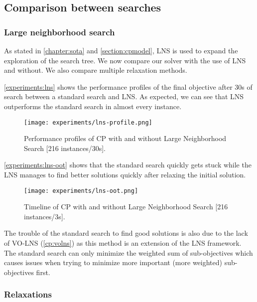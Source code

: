 \documentclass[../../thesis.tex]{subfiles}
\begin{document}
\FloatBarrier

\subsection{Comparison between searches}

\subsubsection{Large neighborhood search}


As stated in \autoref{chapter:sota} and \autoref{section:cpmodel}, LNS is used to expand the exploration
of the search tree. We now compare our solver with the use of LNS and without. We also compare multiple 
relaxation methods.


\autoref{experiments:lns} shows the performance profiles of the final objective after 30s of search 
between a standard search and LNS. As expected, we can see that LNS outperforms the standard search 
in almost every instance. 

\begin{figure}
  \centering
  \texttt{[image: experiments/lns-profile.png]}
  \caption{Performance profiles of CP with and without Large Neighborhood Search [216 instances/30s].}
  \label{experiments:lns}
\end{figure}


\autoref{experiments:lns-oot} shows that the standard search quickly gets stuck
while the LNS manages to find better solutions quickly after relaxing the initial solution.


\begin{figure}
  \centering
  \texttt{[image: experiments/lns-oot.png]}
  \caption{Timeline of CP with and without Large Neighborhood Search [216 instances/3s].}
  \label{experiments:lns-oot}
\end{figure}


\FloatBarrier

The trouble of the standard search to find good solutions is also due to the lack of VO-LNS (\autoref{cp:volns}) as 
this method is an extension of the LNS framework. The standard search can only minimize the weighted sum of sub-objectives
which causes issues when trying to minimize more important (more weighted) sub-objectives first.


\subsubsection{Relaxations}
\end{document}
